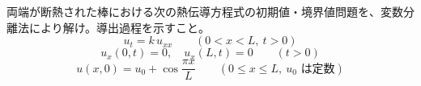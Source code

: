 
両端が断熱された棒における次の熱伝導方程式の初期値・境界値問題を、変数分離法により解け。導出過程を示すこと。
\[
u_t = k\,u_{xx} \qquad (0 < x < L,\ t > 0)
\]
\[
u_x(0,t) = 0,\quad u_x(L,t) = 0 \qquad (t > 0)
\]
\[
u(x,0) = u_0 + \cos\frac{\pi x}{L} \qquad (0 \le x \le L,\ u_0 \text{ は定数})
\]
